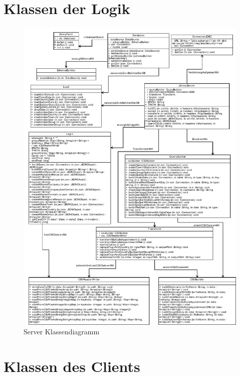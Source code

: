 \section{Klassen der Logik}

\begin{figure}[htbp]
\begin{center}
\includegraphics[width=1.0\textwidth]{pics/ServerKlassendiagramm.pdf}
\caption{Server Klassendiagramm}
\label{umsetzung_klassendiagramm_server}
\end{center}
\end{figure}

\section{Klassen des Clients}

